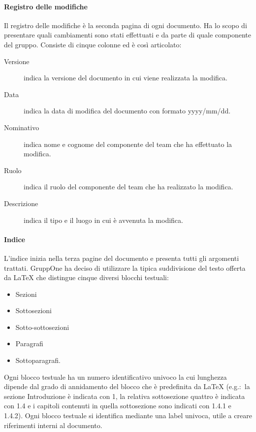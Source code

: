 \documentclass[../norme-di-progetto.tex]{subfiles}
\begin{document}
\paragraph{Registro delle modifiche}%
\label{par:registro_delle_modifiche}
Il registro delle modifiche è la seconda pagina di ogni documento. Ha lo scopo di presentare quali cambiamenti sono stati effettuati e da parte di quale componente del gruppo. Consiste di cinque colonne ed è così articolato:
\begin{description}
  \item [Versione] indica la versione del documento in cui viene realizzata la modifica.
  \item [Data] indica la data di modifica del documento con formato yyyy/mm/dd.
  \item [Nominativo] indica nome e cognome del componente del team che ha effettuato la modifica.
  \item [Ruolo] indica il ruolo del componente del team che ha realizzato la modifica.
  \item [Descrizione] indica il tipo e il luogo in cui è avvenuta la modifica.
\end{description}

\paragraph{Indice}%
\label{par:indice}
L'indice inizia nella terza pagine del documento e presenta tutti gli argomenti trattati.
GruppOne ha deciso di utilizzare la tipica suddivisione del testo offerta da \LaTeX{} che distingue cinque diversi blocchi testuali:
\begin{itemize}
  \item Sezioni
  \item Sottosezioni
  \item Sotto-sottosezioni
  \item Paragrafi
  \item Sottoparagrafi.
\end{itemize}

Ogni blocco testuale ha un numero identificativo univoco la cui lunghezza dipende dal grado di annidamento del blocco che è predefinita da \LaTeX{} (e.g.:\ la sezione Introduzione è indicata con 1, la relativa sottosezione quattro è indicata con 1.4 e i capitoli contenuti in quella sottosezione sono indicati con 1.4.1 e 1.4.2).
Ogni blocco testuale si identifica mediante una label univoca, utile a creare riferimenti interni al documento.
\end{document}
